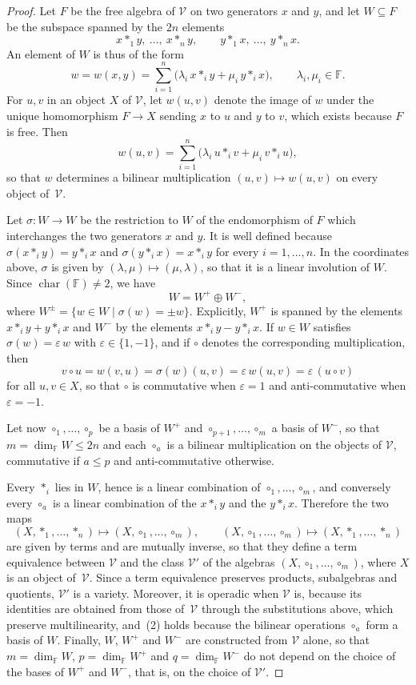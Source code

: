 \documentclass[reqno,a4paper]{amsart}
\theoremstyle{plain}
\theoremstyle{definition}
\theoremstyle{remark}
\numberwithin{equation}{section}
\newcommand{\F}{\mathbb{F}}
\newcommand{\V}{\mathcal{V}}
\DeclareMathOperator{\bchar}{char}
\begin{document}
\begin{proof}
Let $F$ be the free algebra of $\V$ on two generators $x$ and $y$, and let $W\subseteq F$ be the subspace spanned by the $2n$ elements
\[
x\ast_1y,\ \ldots,\ x\ast_ny,
\qquad
y\ast_1x,\ \ldots,\ y\ast_nx .
\]
An element of $W$ is thus of the form
\[
w=w(x,y)=\sum_{i=1}^{n}\bigl(\lambda_i\,x\ast_iy+\mu_i\,y\ast_ix\bigr),
\qquad
\lambda_i,\mu_i\in\F.
\]
For $u,v$ in an object $X$ of $\V$, let $w(u,v)$ denote the image of $w$ under the unique homomorphism $F\to X$ sending $x$ to $u$ and $y$ to $v$, which exists because $F$ is free. Then
\[
w(u,v)=\sum_{i=1}^{n}\bigl(\lambda_i\,u\ast_iv+\mu_i\,v\ast_iu\bigr),
\]
so that $w$ determines a bilinear multiplication $(u,v)\mapsto w(u,v)$ on every object of~$\V$.

Let $\sigma\colon W\to W$ be the restriction to $W$ of the endomorphism of $F$ which interchanges the two generators $x$ and $y$. It is well defined because $\sigma(x\ast_iy)=y\ast_ix$ and $\sigma(y\ast_ix)=x\ast_iy$ for every $i=1,\ldots,n$. In the coordinates above, $\sigma$ is given by $(\lambda,\mu)\mapsto(\mu,\lambda)$, so that it is a linear involution of $W$. Since $\bchar(\F)\neq2$, we have
\[
W=W^+\oplus W^-,
\]
where $W^{\pm}=\{w\in W\mid\sigma(w)=\pm w\}$. Explicitly, $W^+$ is spanned by the elements $x\ast_iy+y\ast_ix$ and $W^-$ by the elements $x\ast_iy-y\ast_ix$. If $w\in W$ satisfies $\sigma(w)=\varepsilon\,w$ with $\varepsilon\in\{1,-1\}$, and if $\circ$ denotes the corresponding multiplication, then
\[
v\circ u=w(v,u)=\sigma(w)(u,v)=\varepsilon\,w(u,v)=\varepsilon\,(u\circ v)
\]
for all $u,v\in X$, so that $\circ$ is commutative when $\varepsilon=1$ and anti-commutative when $\varepsilon=-1$.

Let now $\circ_1,\ldots,\circ_p$ be a basis of $W^+$ and $\circ_{p+1},\ldots,\circ_m$ a basis of $W^-$, so that $m=\dim_\F W\leq2n$ and each $\circ_a$ is a bilinear multiplication on the objects of $\V$, commutative if $a\leq p$ and anti-commutative otherwise.

Every $\ast_i$ lies in $W$, hence is a linear combination of $\circ_1,\ldots,\circ_m$, and conversely every $\circ_a$ is a linear combination of the $x\ast_iy$ and the $y\ast_ix$. Therefore the two maps
\[
(X,\ast_1,\ldots,\ast_n)\longmapsto(X,\circ_1,\ldots,\circ_m),
\qquad
(X,\circ_1,\ldots,\circ_m)\longmapsto(X,\ast_1,\ldots,\ast_n)
\]
are given by terms and are mutually inverse, so that they define a term equivalence between $\V$ and the class $\V'$ of the algebras $(X,\circ_1,\ldots,\circ_m)$, where $X$ is an object of~$\V$. Since a term equivalence preserves products, subalgebras and quotients, $\V'$ is a variety. Moreover, it is operadic when $\V$ is, because its identities are obtained from those of~$\V$ through the substitutions above, which preserve multilinearity, and~(2) holds because the bilinear operations $\circ_a$ form a basis of $W$. Finally, $W$, $W^+$ and $W^-$ are constructed from $\V$ alone, so that $m=\dim_\F W$, $p=\dim_\F W^+$ and $q=\dim_\F W^-$ do not depend on the choice of the bases of $W^+$ and $W^-$, that is, on the choice of $\V'$.
\end{proof}
\end{document}
